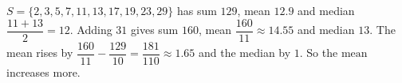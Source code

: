 $S=\{2,3,5,7,11,13,17,19,23,29\}$ has sum $129$, mean $12.9$ and median $\dfrac{11+13}2=12$. Adding $31$ gives sum $160$, mean $\dfrac{160}{11}\approx14.55$ and median $13$. The mean rises by $\dfrac{160}{11}-\dfrac{129}{10}=\dfrac{181}{110}\approx1.65$ and the median by $1$. So the $\boxed{\text{mean}}$ increases more.
